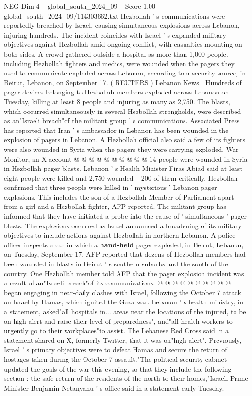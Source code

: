 \begin{textsample}{NEG Dim 4 – global\_south\_2024\_09 – Score 1.00 – global\_south\_2024\_09/114303662.txt}  \label{ex:f4_neg_167}
Hezbollah ' s communications were reportedly breached by Israel, causing simultaneous explosions across Lebanon, injuring hundreds.
The incident coincides with Israel ' s expanded military objectives against Hezbollah amid ongoing conflict, with casualties mounting on both sides.
A crowd gathered outside a hospital as more than 1,000 people, including Hezbollah fighters and medics, were wounded when the pagers they used to communicate exploded across Lebanon, according to a security source, in Beirut, Lebanon, on September 17. ( REUTERS ) Lebanon News : Hundreds of pager devices belonging to Hezbollah members exploded across Lebanon on Tuesday, killing at least 8 people and injuring as many as 2,750.
The blasts, which occurred simultaneously in several Hezbollah strongholds, were described as an"Israeli breach"of the militant group ' s communications.
Associated Press has reported that Iran ' s ambassador in Lebanon has been wounded in the explosion of pagers in Lebanon.
A Hezbollah official also said a few of its fighters were also wounded in Syria when the pagers they were carrying exploded.
War Monitor, an X account @ @ @ @ @ @ @ @ @ @ 14 people were wounded in Syria in Hezbollah pager blasts.
Lebanon ' s Health Minister Firas Abiad said at least eight people were killed and 2,750 wounded -- 200 of them critically.
Hezbollah confirmed that three people were killed in ' mysterious ' Lebanon pager explosions.
This includes the son of a Hezbollah Member of Parliament apart from a girl and a Hezbollah fighter, AFP reported.
The militant group has informed that they have initiated a probe into the cause of ' simultaneous ' pager blasts.
The explosions occurred as Israel announced a broadening of its military objectives to include actions against Hezbollah in northern Lebanon.
A police officer inspects a car in which a \textbf{hand-held} pager exploded, in Beirut, Lebanon, on Tuesday, September 17.
AFP reported that dozens of Hezbollah members had been wounded in blasts in Beirut ' s southern suburbs and the south of the country.
One Hezbollah member told AFP that the pager explosion incident was a result of an"Israeli breach"of its communications. @ @ @ @ @ @ @ @ @ @ began engaging in near-daily clashes with Israel, following the October 7 attack on Israel by Hamas, which ignited the Gaza war.
Lebanon ' s health ministry, in a statement, asked"all hospitals in... areas near the locations of the injured, to be on high alert and raise their level of preparedness", and"all health workers to urgently go to their workplaces"to assist.
The Lebanese Red Cross said in a statement shared on X, formerly Twitter, that it was on"high alert".
Previously, Israel ' s primary objectives were to defeat Hamas and secure the return of hostages taken during the October 7 assault."The political-security cabinet updated the goals of the war this evening, so that they include the following section : the safe return of the residents of the north to their homes,"Israeli Prime Minister Benjamin Netanyahu ' s office said in a statement early Tuesday.

\end{textsample}
